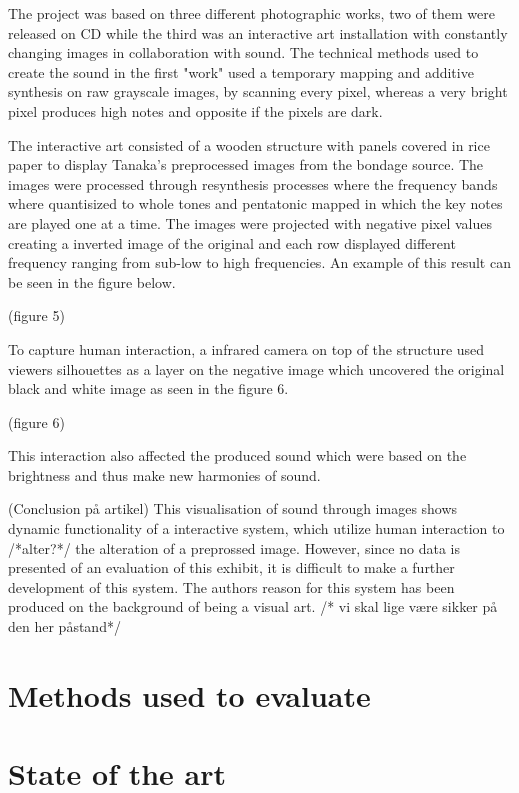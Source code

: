 The project was based on three different photographic works, two of them were released on CD while the third was an interactive art installation with constantly changing images in collaboration with sound. The technical methods used to create the sound in the first "work" used a temporary mapping and additive synthesis on raw grayscale images, by scanning every pixel, whereas a very bright pixel produces high notes and opposite if the pixels are dark. 

The interactive art consisted of a wooden structure with panels covered in rice paper to display Tanaka's preprocessed images from the bondage source. The images were processed through resynthesis processes where the frequency bands where quantisized to whole tones and pentatonic mapped in which the key notes are played one at a time. The images were projected with negative pixel values creating a inverted image of the original and each row displayed different frequency ranging from sub-low to high frequencies. An example of this result can be seen in the figure below. 

(figure 5)

To capture human interaction, a infrared camera on top of the structure used viewers silhouettes as a layer on the negative image which uncovered the original black and white image as seen in the figure 6.

(figure 6)

This interaction also affected the produced sound which were based on the brightness and thus make new harmonies of sound. 

(Conclusion på artikel)
This visualisation of sound through images shows dynamic functionality of a interactive system, which utilize human interaction to /*alter?*/ the alteration of a preprossed image. However, since no data is presented of an evaluation of this exhibit, it is difficult to make a further development of this system. The authors reason for this system has been produced on the background of being a visual art. /* vi skal lige være sikker på den her påstand*/   
 

\section{Methods used to evaluate}\label{sub:methodsusedtoevaluate}






\section{State of the art}\label{sec:stateart}

